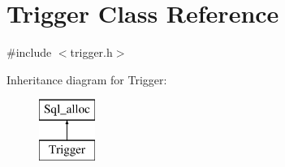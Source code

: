 \hypertarget{classTrigger}{}\section{Trigger Class Reference}
\label{classTrigger}


{\ttfamily \#include $<$trigger.\+h$>$}

Inheritance diagram for Trigger\+:\begin{figure}[H]
\begin{center}
\leavevmode
\includegraphics[height=2.000000cm]{classTrigger}
\end{center}
\end{figure}
